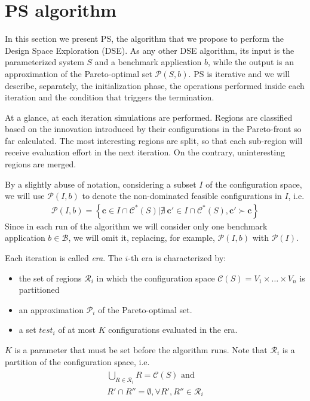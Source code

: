 
\section{PS algorithm}
In this section we present PS, the algorithm that we propose to perform the Design Space Exploration (DSE). As any other DSE algorithm, its input is the parameterized system $S$ and a benchmark application $b$, while the output is an approximation of the Pareto-optimal set $\mathcal{P}\left(S,b\right)$.   
PS is iterative and we will describe, separately, the initialization phase, the operations performed inside each iteration and the condition that triggers the termination.

At a glance, at each iteration simulations are performed. Regions are classified based on the innovation introduced by their configurations in the Pareto-front so far calculated. The most interesting regions are split, so that each sub-region will receive evaluation effort in the next iteration. On the contrary, uninteresting regions are merged.

By a slightly abuse of notation, considering a subset $I$ of the configuration space, we will use  $\mathcal{P}(I,b)$ to denote the non-dominated feasible configurations in $I$, i.e.
	\begin{align}
		\mathcal{P}(I,b)=
		\left\{ \mathbf{c} \in I \cap \mathcal{C}^*(S) | \nexists \ \mathbf{c}' \in I \cap \mathcal{C}^*(S), \mathbf{c}' \succ \mathbf{c} \right\}
	\end{align}
Since in each run of the algorithm we will consider only one benchmark application $b\in\mathcal{B}$, we will omit it, replacing, for example, $\mathcal{P}(I,b)$ with  $\mathcal{P}(I)$.

Each iteration is called \emph{era}. The $i$-th era is characterized by: 
	\begin{itemize}
	\item the set of regions $\mathcal{R}_{i}$ in which the configuration space
	$\mathcal{C}(S)=V_{1}\times\dots\times V_{n}$ is partitioned
	\item an approximation $\mathscr{P}_{i}$ of the Pareto-optimal set.
	\item a set $test_{i}$ of at most $K$ configurations evaluated
	in the era.
	\end{itemize}
$K$ is a parameter that must be set before the algorithm runs.
Note that $\mathcal{R}_{i}$ is a partition of the configuration space, i.e.
	\begin{align}\begin{array}{l}
		\bigcup_{R\in\mathcal{R}_i} R = \mathcal{C}(S) \mbox{ and}\\
		R' \cap R'' = \emptyset, \forall R',R'' \in \mathcal{R}_i
	\end{array}\end{align}


